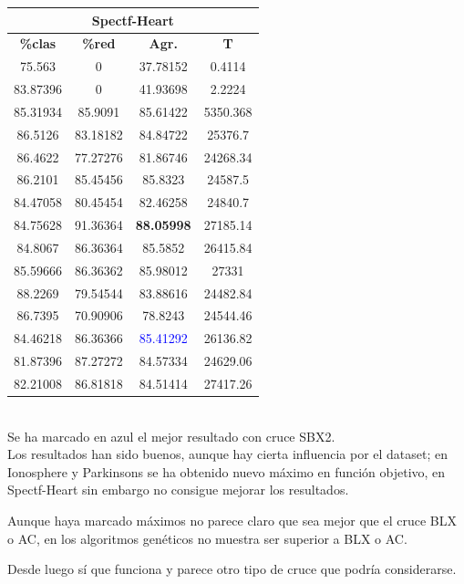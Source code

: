 \documentclass[11pt,a4paper]{article}
\theoremstyle{definition}
\begin{document}
\begin{tabbing}
{		\begin{tabular}{|c|c|c|c|}
			\hline
			\multicolumn{4}{|c|}{\textbf{Spectf-Heart}} \\ \hline
			\textbf{\%clas} & \textbf{\%red} & \textbf{Agr.} & \textbf{T} \\ \hline 
			75.563	  &0	      &37.78152	&0.4114\\ \hline
83.87396	&0	      &41.93698	&2.2224\\ \hline
85.31934	&85.9091	&85.61422	&5350.368\\ \hline
86.5126 & 83.18182 & 84.84722 & 25376.7\\ \hline
86.4622 & 77.27276 & 81.86746 & 24268.34\\ \hline
86.2101 & 85.45456 & 85.8323 & 24587.5\\ \hline
84.47058 & 80.45454 & 82.46258 & 24840.7\\ \hline
84.75628 & 91.36364 & \textbf{88.05998} & 27185.14\\ \hline
84.8067 & 86.36364 & 85.5852 & 26415.84\\ \hline
85.59666 & 86.36362 & 85.98012 & 27331\\ \hline
88.2269 & 79.54544 & 83.88616 & 24482.84 \\ \hline
86.7395 & 70.90906 & 78.8243 & 24544.46 \\ \hline
84.46218 & 86.36366 & \textcolor{blue}{85.41292} & 26136.82 \\ \hline
81.87396 & 87.27272 & 84.57334 & 24629.06 \\ \hline
82.21008 & 86.81818 & 84.51414 & 27417.26 \\ \hline
		\end{tabular}
		}
	\end{tabbing}~\\
	
	Se ha marcado en azul el mejor resultado con cruce SBX2.\\
	
	 Los resultados han sido buenos, aunque hay cierta influencia por el dataset; en Ionosphere y Parkinsons se ha obtenido nuevo máximo en función objetivo, en Spectf-Heart sin embargo no consigue mejorar los resultados.
	
	Aunque haya marcado máximos no parece claro que sea mejor que el cruce BLX o AC, en los algoritmos genéticos no muestra ser superior a BLX o AC.
	
	Desde luego sí que funciona y parece otro tipo de cruce que podría considerarse.
\end{document}

